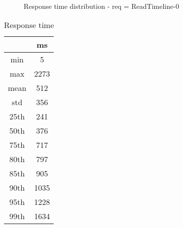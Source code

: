 \begin{minipage}{0.75\linewidth}
\begin{figure}[h]
\begin{adjustbox}{max width=1.0\linewidth, keepaspectratio}
  \end{adjustbox}
  \caption{Response time distribution - req = ReadTimeline-0}
\end{figure}
\end{minipage}\hfill\begin{minipage}{0.18\linewidth}
\begin{table}[h]
\begin{tabular}{|cc|}
\hline
\textbf{} & \textbf{ms}\\ \hline
 \Xhline{0.005\arrayrulewidth}
min & 5\\
 \Xhline{0.005\arrayrulewidth}
max & 2273\\
 \Xhline{0.005\arrayrulewidth}
mean & 512\\
 \Xhline{0.005\arrayrulewidth}
std & 356\\
\hline
\hline
 \Xhline{0.005\arrayrulewidth}
25th & 241\\
 \Xhline{0.005\arrayrulewidth}
50th & 376\\
 \Xhline{0.005\arrayrulewidth}
75th & 717\\
 \Xhline{0.005\arrayrulewidth}
80th & 797\\
 \Xhline{0.005\arrayrulewidth}
85th & 905\\
 \Xhline{0.005\arrayrulewidth}
90th & 1035\\
 \Xhline{0.005\arrayrulewidth}
95th & 1228\\
 \Xhline{0.005\arrayrulewidth}
99th & 1634\\
\hline
\end{tabular}
\caption{Response time}
\end{table}
\end{minipage}\hfill